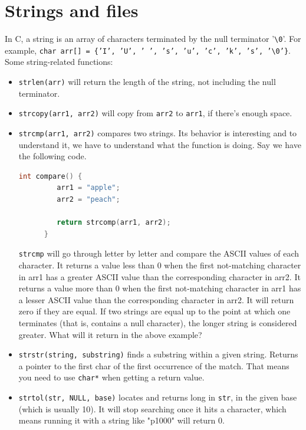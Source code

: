 \documentclass[nobib]{tufte-handout}
\begin{document}
\section{Strings and files}
In C, a string is an array of characters terminated by the null terminator '\texttt{\textbackslash 0}'.
For example, \texttt{char arr[] = \{'I', 'U', ' ', 's', 'u', 'c', 'k', 's', '\textbackslash0'\}}. 
Some string-related functions: 
\begin{itemize}
   \item \texttt{strlen(arr)} will return the length of the string, not including the null terminator. 
   \item \texttt{strcopy(arr1, arr2)} will copy from \texttt{arr2} to \texttt{arr1}, if there's enough space. 
   \item \texttt{strcmp(arr1, arr2)} compares two strings. Its behavior is interesting and to understand 
   it, we have to understand what the function is doing. Say we have the following code. 
   \begin{lstlisting}[language=C,caption=strcomp]
      int compare() {
         arr1 = "apple";
         arr2 = "peach";

         return strcomp(arr1, arr2);
      }
   \end{lstlisting}
   \texttt{strcmp} will go through letter by letter and compare the ASCII values of 
   each character. It returns a value less than 0 when the first 
   not-matching character in arr1 has a greater ASCII value than 
   the corresponding character in arr2. It returns a value more than 0 when the first not-matching 
   character in arr1 has a lesser ASCII value than the corresponding 
   character in arr2. It will return zero if they are equal.  If two strings are equal 
   up to the point at which one terminates (that is, contains a null character), 
   the longer string is considered greater. What will it return in the above example?
   \item \texttt{strstr(string, substring)} finds a substring within a given string. Returns a pointer to 
   the first char of the first occurrence of the match. That means you need to use \texttt{char*} when 
   getting a return value. 
   \item \texttt{strtol(str, NULL, base)} locates and returns long in \texttt{str}, in the given base (which is usually 10). 
   It will stop searching once it hits a character, which means running it with 
   a string like "p1000" will return 0. 
\end{itemize}
\end{document}
